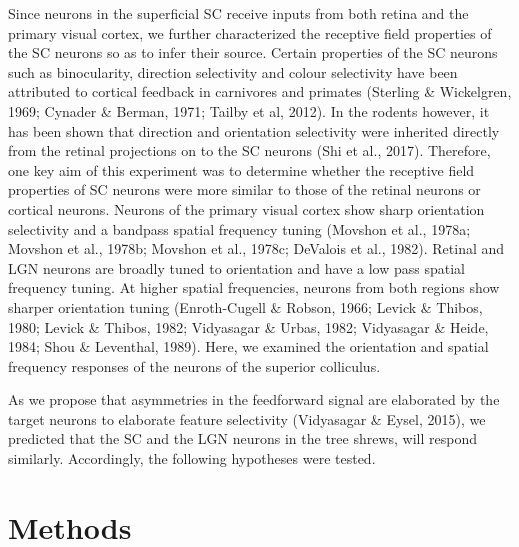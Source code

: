Since neurons in the superficial SC receive inputs from both retina and the primary visual cortex, we further characterized the receptive field properties of the SC neurons so as to infer their source. Certain properties of the SC neurons such as binocularity, direction selectivity and colour selectivity have been attributed to cortical feedback in carnivores and primates (Sterling \& Wickelgren, 1969; Cynader \& Berman, 1971; Tailby et al, 2012). In the rodents however, it has been shown that direction and orientation selectivity were inherited directly from the retinal projections on to the SC neurons (Shi et al., 2017). Therefore, one key aim of this experiment was to determine whether the receptive field properties of SC neurons were more similar to those of the retinal neurons or cortical neurons. Neurons of the primary visual cortex show sharp orientation selectivity and a bandpass spatial frequency tuning (Movshon et al., 1978a; Movshon et al., 1978b; Movshon et al., 1978c; DeValois et al., 1982). Retinal and LGN neurons are broadly tuned to orientation and have a low pass spatial frequency tuning. At higher spatial frequencies, neurons from both regions show sharper orientation tuning (Enroth-Cugell \& Robson, 1966; Levick \& Thibos, 1980; Levick \& Thibos, 1982; Vidyasagar \& Urbas, 1982; Vidyasagar \& Heide, 1984; Shou \& Leventhal, 1989). Here, we examined the orientation and spatial frequency responses of the neurons of the superior colliculus.

As we propose that asymmetries in the feedforward signal are elaborated by the target neurons to elaborate feature selectivity (Vidyasagar \& Eysel, 2015), we predicted that the SC and the LGN neurons in the tree shrews, will respond similarly.  Accordingly, the following hypotheses were tested.





	
	\section{Methods}
